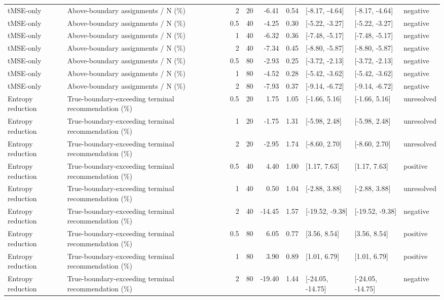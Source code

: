 \begin{longtable}{p{1.8cm}p{3.0cm}rrrrp{2.6cm}p{2.6cm}p{1.6cm}}
tMSE-only & Above-boundary assignments / N (\%) & 2 & 20 & -6.41 & 0.54 & [-8.17, -4.64] & [-8.17, -4.64] & negative \\
tMSE-only & Above-boundary assignments / N (\%) & 0.5 & 40 & -4.25 & 0.30 & [-5.22, -3.27] & [-5.22, -3.27] & negative \\
tMSE-only & Above-boundary assignments / N (\%) & 1 & 40 & -6.32 & 0.36 & [-7.48, -5.17] & [-7.48, -5.17] & negative \\
tMSE-only & Above-boundary assignments / N (\%) & 2 & 40 & -7.34 & 0.45 & [-8.80, -5.87] & [-8.80, -5.87] & negative \\
tMSE-only & Above-boundary assignments / N (\%) & 0.5 & 80 & -2.93 & 0.25 & [-3.72, -2.13] & [-3.72, -2.13] & negative \\
tMSE-only & Above-boundary assignments / N (\%) & 1 & 80 & -4.52 & 0.28 & [-5.42, -3.62] & [-5.42, -3.62] & negative \\
tMSE-only & Above-boundary assignments / N (\%) & 2 & 80 & -7.93 & 0.37 & [-9.14, -6.72] & [-9.14, -6.72] & negative \\
Entropy reduction & True-boundary-exceeding terminal recommendation (\%) & 0.5 & 20 & 1.75 & 1.05 & [-1.66, 5.16] & [-1.66, 5.16] & unresolved \\
Entropy reduction & True-boundary-exceeding terminal recommendation (\%) & 1 & 20 & -1.75 & 1.31 & [-5.98, 2.48] & [-5.98, 2.48] & unresolved \\
Entropy reduction & True-boundary-exceeding terminal recommendation (\%) & 2 & 20 & -2.95 & 1.74 & [-8.60, 2.70] & [-8.60, 2.70] & unresolved \\
Entropy reduction & True-boundary-exceeding terminal recommendation (\%) & 0.5 & 40 & 4.40 & 1.00 & [1.17, 7.63] & [1.17, 7.63] & positive \\
Entropy reduction & True-boundary-exceeding terminal recommendation (\%) & 1 & 40 & 0.50 & 1.04 & [-2.88, 3.88] & [-2.88, 3.88] & unresolved \\
Entropy reduction & True-boundary-exceeding terminal recommendation (\%) & 2 & 40 & -14.45 & 1.57 & [-19.52, -9.38] & [-19.52, -9.38] & negative \\
Entropy reduction & True-boundary-exceeding terminal recommendation (\%) & 0.5 & 80 & 6.05 & 0.77 & [3.56, 8.54] & [3.56, 8.54] & positive \\
Entropy reduction & True-boundary-exceeding terminal recommendation (\%) & 1 & 80 & 3.90 & 0.89 & [1.01, 6.79] & [1.01, 6.79] & positive \\
Entropy reduction & True-boundary-exceeding terminal recommendation (\%) & 2 & 80 & -19.40 & 1.44 & [-24.05, -14.75] & [-24.05, -14.75] & negative \\

\end{longtable}
